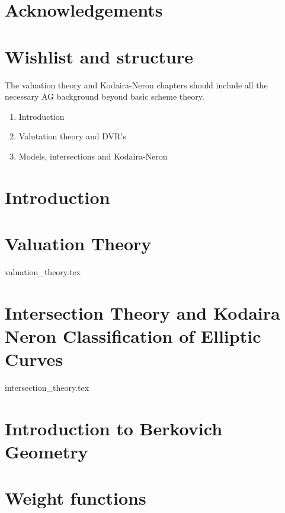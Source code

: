 


\rmfamily
\setcounter{page}{0}
\newpage
\tableofcontents
\chapter*{Acknowledgements} \label{chap:acknowledgements}

\setcounter{chapter}{-1}
\chapter{Wishlist and structure} \label{chap:wishlist}
The valuation theory and Kodaira-Neron chapters should include all the necessary AG background beyond basic scheme theory. 
\begin{enumerate}
	\item Introduction
	\item Valutation theory and DVR's
	\item Models, intersections and Kodaira-Neron
\end{enumerate}


\setcounter{page}{0}

\chapter{Introduction} \label{chap:introduction}
%

\chapter{Valuation Theory} \label{chap:valuation_theory}
{valuation_theory.tex}


\chapter[Intersection theory]{Intersection Theory and Kodaira Neron Classification of Elliptic Curves} \label{chap:intersection_theory} 
{intersection_theory.tex}

\chapter{Introduction to Berkovich Geometry} \label{chap:affinoid_algerbas}
%


\chapter{Weight functions} \label{chap:weight_functions}


\pagebreak
\printbibliography


